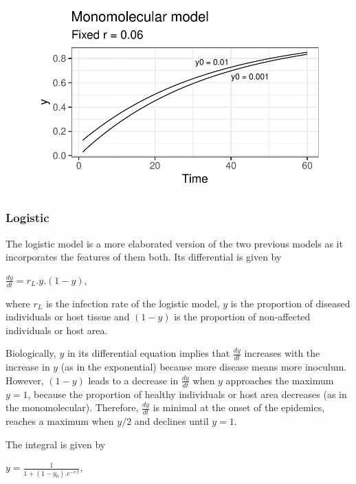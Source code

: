\documentclass[
  letterpaper,
  DIV=11,
  numbers=noendperiod]{scrreprt}
\begin{document}
\begin{figure}[H]

{\centering \includegraphics{./temporal-models_files/figure-pdf/unnamed-chunk-12-1.pdf}

}

\end{figure}

\hypertarget{logistic}{%
\subsubsection{Logistic}\label{logistic}}

The logistic model is a more elaborated version of the two previous
models as it incorporates the features of them both. Its differential is
given by

\(\frac{dy}{dt} = r_L. y . (1 - y)\),

where \(r_L\) is the infection rate of the logistic model, \(y\) is the
proportion of diseased individuals or host tissue and \((1-y)\) is the
proportion of non-affected individuals or host area.

Biologically, \(y\) in its differential equation implies that
\(\frac{dy}{dt}\) increases with the increase in \(y\) (as in the
exponential) because more disease means more inoculum. However,
\((1-y)\) leads to a decrease in \(\frac{dy}{dt}\) when \(y\) approaches
the maximum \(y=1\), because the proportion of healthy individuals or
host area decreases (as in the monomolecular). Therefore,
\(\frac{dy}{dt}\) is minimal at the onset of the epidemics, reaches a
maximum when \(y/2\) and declines until \(y=1\).

The integral is given by

\(y = \frac{1}{1 + (1-y_0).e^{-r.t}}\),
\end{document}
